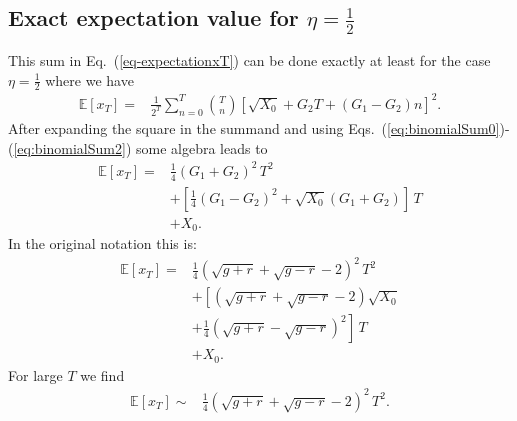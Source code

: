 \documentclass[11pt]{article}
\begin{document}
\begin{multicols}{2}
\section{Exact expectation value for $\eta=\frac{1}{2}$}

This sum in Eq.~(\ref{eq-expectationxT}) can be done exactly at least for the case $\eta = \frac{1}{2}$ where we have
\begin{align*}
 \mathbb{E}\left[x_T \right] =& \frac{1}{2^T} \sum_{n=0}^T  {T \choose n} \left[\sqrt{X_0}  +G_2 T + (G_1-G_2) n \right]^2.
\end{align*}
After expanding the square in the summand and using Eqs.~(\ref{eq:binomialSum0})-(\ref{eq:binomialSum2}) some algebra leads to
\begin{align*}
 \mathbb{E}\left[x_T \right] =& \frac{1}{4} (G_1+G_2)^2\, T^2 \\
 & + \left[\frac{1}{4}(G_1-G_2)^2 + \sqrt{X_0} (G_1+G_2)\right]\,T\\
 & +X_0.
\end{align*}
In the original notation this is:
\begin{align}
\label{eq:expectationExact} \mathbb{E}\left[x_T\right] =& \frac{1}{4}\left(\sqrt{g+r}+\sqrt{g-r}-2\right)^2\,T^2 \\
\nonumber &+ \left[ (\sqrt{g+r}+\sqrt{g-r}-2) \sqrt{X_0} \right.\\
\nonumber & \left.+ \frac{1}{4}(\sqrt{g+r}-\sqrt{g-r})^2\right]\,T\\
\nonumber &+ X_0.
\end{align}
For large  $T$ we find
\begin{align}
\label{eq:ExLargeT}
\mathbb{E}\left[x_T \right]  \sim & \frac{1}{4} \left( \sqrt{g+r} + \sqrt{g-r} -2\right)^2\, T^2.
\end{align}



\end{multicols}
\end{document}
